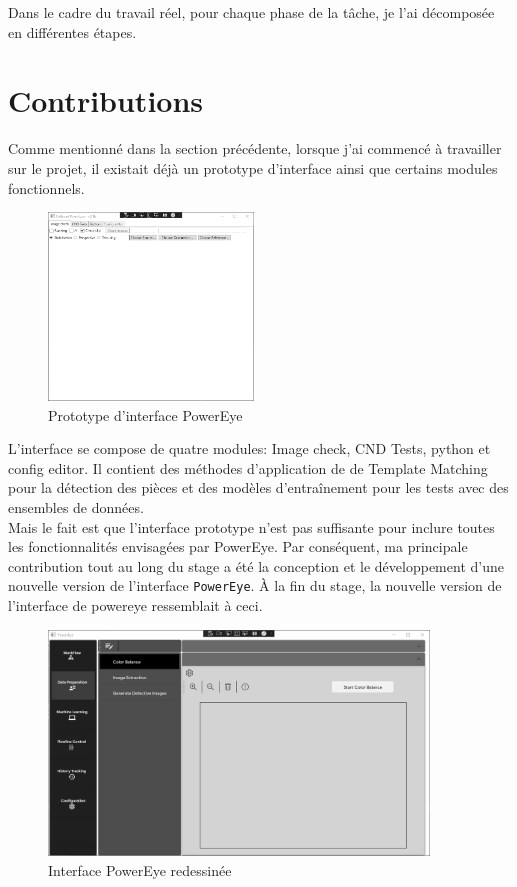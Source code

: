 Dans le cadre du travail réel, pour chaque phase de la tâche, je l'ai décomposée en différentes étapes. 


\newpage
\section{Contributions}
Comme mentionné dans la section précédente, lorsque j'ai commencé à travailler sur le projet, il existait déjà un prototype d'interface ainsi que certains modules fonctionnels.
\begin{figure}[H]
    \centering
    \includegraphics[height=5cm]{ressources/images/prototype.png}
    \caption{Prototype d'interface PowerEye}
\end{figure}
L'interface se compose de quatre modules: Image check, CND Tests, python et config editor. Il contient des méthodes d'application de de Template Matching pour la détection des pièces et des modèles d'entraînement pour les tests avec des ensembles de données.\\
Mais le fait est que l'interface prototype n'est pas suffisante pour inclure toutes les fonctionnalités envisagées par PowerEye. Par conséquent, ma principale contribution tout au long du stage a été la conception et le développement d'une nouvelle version de l'interface \texttt{PowerEye}. À la fin du stage, la nouvelle version de l'interface de powereye ressemblait à ceci. \\
\begin{figure}[H]
    \centering
    \includegraphics[height=6cm]{ressources/images/color_balance.png}
    \caption{Interface PowerEye redessinée}
\end{figure}
